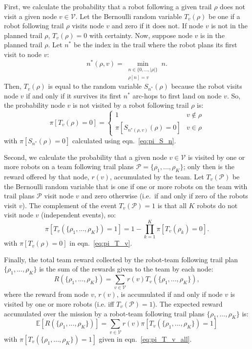 \documentclass[fleqn,10pt,lineno]{wlpeerj}
\begin{document}
First, we calculate the probability that a robot following a given trail $\rho$ does not visit a given node $v\in \mathcal{V}$.
Let the Bernoulli random variable $T_v(\rho)$ be one if a robot following trail $\rho$ visits node $v$ and zero if it does not.
If node $v$ is not in the planned trail $\rho$, $T_v(\rho)=0$ with certainty. 
Now, suppose node $v$ is in the planned trail $\rho$. Let $n^*$ be the index in the trail where the robot plans its first visit to node $v$:
\begin{equation}
n^*(\rho, v) = \min_{
	\substack{n \in \{0, ..., \lvert \rho \rvert\} \\ \rho[n] = v}
} n.
\end{equation}
Then, $T_v(\rho)$ is equal to the random variable $S_{n^*}(\rho)$ because the robot visits node $v$ if and only if it survives its first $n^*$ arc-hops to first land on node $v$. 
So, the probability node $v$ is not visited by a robot following trail $\rho$ is:
\begin{equation}
	\pi[T_v(\rho) = 0] = 
	\begin{cases}
		1 & v\notin \rho\\
		 \pi [S_{n^*(\rho, v)}(\rho)=0 ] & v \in \rho
	\end{cases}
	 \label{eq:pi_T_v}
\end{equation}
with $\pi[S_{n^*}(\rho)=0]$ calculated using eqn.~\ref{eq:pi_S_n}.

Second, we calculate the probability that a given node $v\in\mathcal{V}$ is visited by one or more robots on a team following trail plans $\mathcal{P}=\{\rho_1, ..., \rho_K\}$; only then is the reward offered by that node, $r(v)$, accumulated by the team.
Let $T_v(\mathcal{P})$ be the Bernoulli random variable that is one if one or more robots on the team with trail plans $\mathcal{P}$ visit node $v$ and zero otherwise (i.e.\ if and only if zero of the robots visit $v$).
The complement of the event $T_v(\mathcal{P})=1$ is that all $K$ robots do not visit node $v$ (independent events), so:
\begin{equation}
	\pi [T_v( \{\rho_1, ..., \rho_K\} ) = 1] = 
	1 - \prod_{k=1}^K \pi[T_v(\rho_k)=0].
	\label{eq:pi_T_v_all}
\end{equation} 
with $\pi[T_v(\rho) = 0]$ in eqn.~\ref{eq:pi_T_v}.

Finally, the total team reward collected by the robot-team following trail plan $\{\rho_1, ..., \rho_K\}$ is the sum of the rewards given to the team by each node:
\begin{equation}
R(\{\rho_1,...,\rho_K\}) = \sum_{v\in\mathcal{V}} r(v)  T_v(\{\rho_1, ..., \rho_K\}),
\end{equation} where the reward from node $v$, $r(v)$, is accumulated if and only if node $v$ is visited by one or more robots (i.e. iff $T_v(\mathcal{P})=1$).
The expected reward accumulated over the mission by a robot-team following trail plans $\{\rho_1, ..., \rho_K\}$ is:
\begin{equation}
	\mathbb{E}[R(\{\rho_1,...,\rho_K\})]= \sum_{v\in\mathcal{V}} r(v) \pi[T_v(\{\rho_1, ..., \rho_K\}) = 1] \label{eq:formula_obj1}
\end{equation}
with $ \pi[T_v(\{\rho_1, ..., \rho_K\}) = 1]$ given in eqn.~\ref{eq:pi_T_v_all}.
\end{document}
